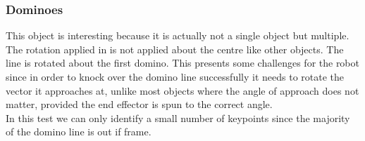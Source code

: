 \subsubsection{Dominoes}
This object is interesting because it is actually not a single object but multiple. The rotation applied in  is not applied about the centre like other objects. The line is rotated about the first domino. This presents some challenges for the robot since in order to knock over the domino line successfully it needs to rotate the vector it approaches at, unlike most objects where the angle of approach does not matter, provided the end effector is spun to the correct angle.\\

In this test we can only identify a small number of keypoints since the majority of the domino line is out if frame.



